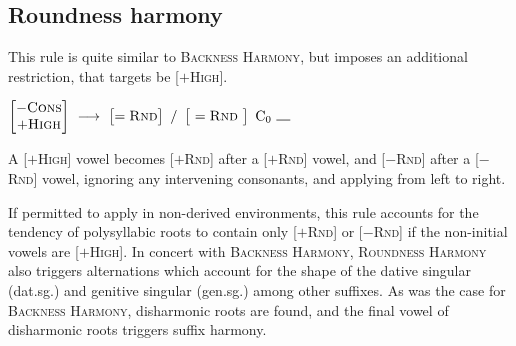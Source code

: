 \subsection{Roundness harmony}

This rule is quite similar to \textsc{Backness Harmony}, but imposes an additional restriction, that targets be [$+$\textsc{High}]. 

\begin{example}
$\begin{bmatrix} -\textsc{Cons} \\ +\textsc{High} \end{bmatrix}~\goesto~\begin{bmatrix} =\textsc{Rnd} \end{bmatrix}~/~\begin{bmatrix}~=\textsc{Rnd}~\end{bmatrix}~\textrm{C}_0~\gap$
\end{example}

\noindent
A [$+$\textsc{High}] vowel becomes [$+$\textsc{Rnd}] after a [$+$\textsc{Rnd}] vowel, and [$-$\textsc{Rnd}] after a [$-$\textsc{Rnd}] vowel, ignoring any intervening consonants, and applying from left to right. 

If permitted to apply in non-derived environments, this rule accounts for the tendency of polysyllabic roots to contain only [$+$\textsc{Rnd}] or [$-$\textsc{Rnd}] if the non-initial vowels are [$+$\textsc{High}]. In concert with \textsc{Backness Harmony}, \textsc{Roundness Harmony} also triggers alternations which account for the shape of the dative singular (dat.sg.) and genitive singular (gen.sg.) among other suffixes. As was the case for \textsc{Backness Harmony}, disharmonic roots are found, and the final vowel of disharmonic roots triggers suffix harmony.


